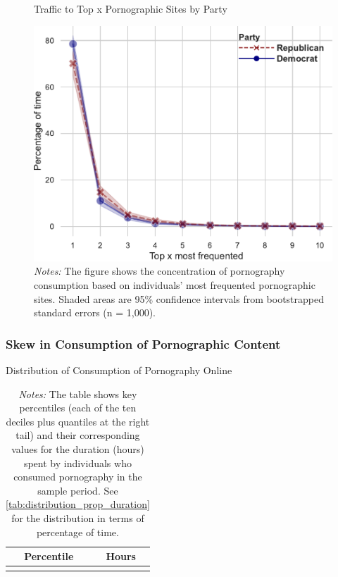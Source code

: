 \documentclass[12pt, letterpaper]{article}
\begin{document}
\begin{figure}
	\centering
	\caption{Traffic to Top x Pornographic Sites by Party}
	\includegraphics[width=.6\textwidth]{figs/concentration_porn_consumption_topX_by_party.pdf}
	\caption*{\footnotesize \emph{Notes:} 
		The figure shows the concentration of pornography consumption based on individuals' most frequented pornographic sites.
		Shaded areas are 95\% confidence intervals from bootstrapped standard errors (n = 1,000).
	}
	\label{fig:concentration_porn_consumption_topX_by_party}
\end{figure}


\FloatBarrier
\subsubsection{Skew in Consumption of Pornographic Content}
\begin{table}[ht] \centering \small \setlength\tabcolsep{10 pt}
	\caption{Distribution of Consumption of Pornography Online}
	\label{tab:distribution_duration}
	\begin{adjustbox}{max width=\textwidth}
		\begin{tabular}{cr}
			\toprule
			\multicolumn{1}{c}{\textbf{Percentile}}&\multicolumn{1}{c}{\textbf{Hours}}\\
			\midrule
			\\
			\bottomrule
		\end{tabular}
	\end{adjustbox}
	\caption*{\footnotesize \emph{Notes:} 
		The table shows key percentiles (each of the ten deciles plus quantiles at the right tail) and their corresponding values for the duration (hours) spent by individuals who consumed pornography in the sample period. 
		See \cref{tab:distribution_prop_duration} for the distribution in terms of percentage of time.
	}
\end{table}
\end{document}
